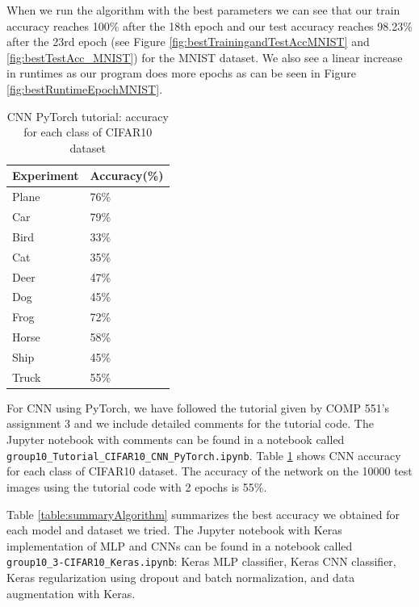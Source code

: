 \documentclass[conference]{IEEEtran}
\begin{document}
When we run the algorithm with the best parameters we can see that our train accuracy reaches 100\% after the 18th epoch and our test accuracy reaches 98.23\% after the 23rd epoch (see Figure \ref{fig:bestTrainingandTestAccMNIST} and \ref{fig:bestTestAcc_MNIST}) for the MNIST dataset. We also see a linear increase in runtimes as our program does more epochs as can be seen in Figure \ref{fig:bestRuntimeEpochMNIST}.

\medskip

\begin{table}[H]
\caption{CNN PyTorch tutorial: accuracy for each class of CIFAR10 dataset}
\label{table:cifar10CNN}
\begin{center}
\begin{adjustbox}{max width=0.99\textwidth}
\begin{tabular}{|l|l|}
\hline
   Experiment                   & Accuracy(\%)   \\
  \hline
 Plane           & 76\%                 \\
 Car           & 79\%                 \\
 Bird           & 33\%                 \\
 Cat           & 35\%                 \\
 Deer           & 47\%                 \\
 Dog           & 45\%                 \\
 Frog           & 72\%                 \\
 Horse           & 58\%                 \\
 Ship           & 45\%                 \\
 Truck           & 55\%                 \\
\hline
\end{tabular}
\end{adjustbox}
\end{center}
\end{table}

For CNN using PyTorch, we have followed the tutorial given by COMP 551's assignment 3 and we include detailed comments for the tutorial code. The Jupyter notebook with comments can be found in a notebook called \texttt{group10\_Tutorial\_CIFAR10\_CNN\_PyTorch.ipynb}. Table \ref{table:cifar10CNN} shows CNN accuracy for each class of CIFAR10 dataset. The accuracy of the network on the 10000 test images using the tutorial code with 2 epochs is 55\%.

Table \ref{table:summaryAlgorithm} summarizes the best accuracy we obtained for each model and dataset we tried. The Jupyter notebook with Keras implementation of MLP and CNNs can be found in a notebook called \texttt{group10\_3-CIFAR10\_Keras.ipynb}: Keras MLP classifier, Keras CNN classifier, Keras regularization using dropout and batch normalization, and data augmentation with Keras.
\end{document}
